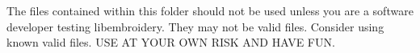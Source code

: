 The files contained within this folder should not be used unless you are a software developer testing libembroidery. They may not be valid files. Consider using known valid files. USE AT YOUR OWN RISK AND HAVE FUN. 